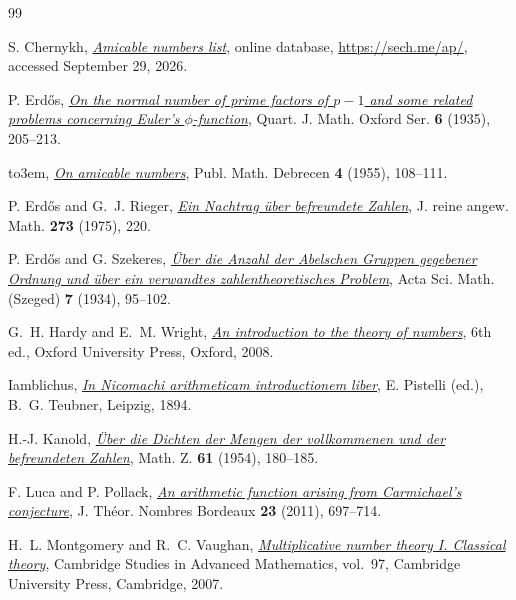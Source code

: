 \documentclass[11pt]{amsart}
\begin{document}
    \begin{thebibliography}{99}
\providecommand{\bysame}{\leavevmode\hbox to3em{\hrulefill}\thinspace}

S. Chernykh,
\href{https://sech.me/ap/}{\emph{Amicable numbers list}},
online database, \url{https://sech.me/ap/},
accessed September 29, 2026.

P. Erd\H{o}s,
\href{https://www.renyi.hu/~p_erdos/1935-08.pdf}{\emph{On the normal number of prime factors of $p-1$ and some related problems concerning Euler's $\phi$-function}},
Quart. J. Math. Oxford Ser. \textbf{6} (1935), 205--213.

\bysame,
\href{https://www.renyi.hu/~p_erdos/1955-03.pdf}{\emph{On amicable numbers}},
Publ. Math. Debrecen \textbf{4} (1955), 108--111.

P. Erd\H{o}s and G.~J. Rieger,
\href{https://www.renyi.hu/~p_erdos/1975-10.pdf}{\emph{Ein Nachtrag \"uber befreundete Zahlen}},
J. reine angew. Math. \textbf{273} (1975), 220.

P. Erd\H{o}s and G. Szekeres,
\href{https://www.renyi.hu/~p_erdos/1934-05.pdf}{\emph{\"Uber die Anzahl der Abelschen Gruppen gegebener Ordnung und \"uber ein verwandtes zahlentheoretisches Problem}},
Acta Sci. Math. (Szeged) \textbf{7} (1934), 95--102.

G.~H. Hardy and E.~M. Wright,
\href{https://academic.oup.com/book/54489}{\emph{An introduction to the theory of numbers}},
6th ed., Oxford University Press, Oxford, 2008.

Iamblichus,
\href{https://books.google.com/books?id=ItofAAAAMAAJ}{\emph{In Nicomachi arithmeticam introductionem liber}},
E. Pistelli (ed.), B.~G. Teubner, Leipzig, 1894.

H.-J. Kanold,
\href{https://doi.org/10.1007/BF01181341}{\emph{\"Uber die Dichten der Mengen der vollkommenen und der befreundeten Zahlen}},
Math. Z. \textbf{61} (1954), 180--185.

F. Luca and P. Pollack,
\href{https://doi.org/10.5802/jtnb.783}{\emph{An arithmetic function arising from Carmichael's conjecture}},
J. Th\'eor. Nombres Bordeaux \textbf{23} (2011), 697--714.

H.~L. Montgomery and R.~C. Vaughan,
\href{https://websites.umich.edu/~hlm/mnt1.html}{\emph{Multiplicative number theory I. Classical theory}},
Cambridge Studies in Advanced Mathematics, vol.~97,
Cambridge University Press, Cambridge, 2007.


\end{thebibliography}
\end{document}
